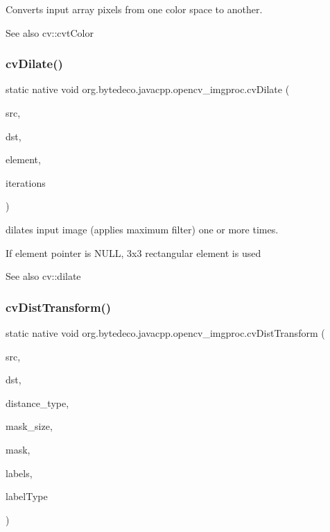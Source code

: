 Converts input array pixels from one color space to another. 

\begin{DoxySeeAlso}{See also}
cv\+::cvt\+Color 
\end{DoxySeeAlso}
\mbox{\label{group__imgproc__c_gae80f82cb5e9876985e59aec2267f7ad4}} 
\subsubsection{\texorpdfstring{cv\+Dilate()}{cvDilate()}}
{\footnotesize\ttfamily static native void org.\+bytedeco.\+javacpp.\+opencv\+\_\+imgproc.\+cv\+Dilate (\begin{DoxyParamCaption}\item[{@Const Cv\+Arr}]{src,  }\item[{Cv\+Arr}]{dst,  }\item[{Ipl\+Conv\+Kernel}]{element,  }\item[{int}]{iterations }\end{DoxyParamCaption})\hspace{0.3cm}{\ttfamily [static]}}



dilates input image (applies maximum filter) one or more times. 

If element pointer is N\+U\+LL, 3x3 rectangular element is used \begin{DoxySeeAlso}{See also}
cv\+::dilate 
\end{DoxySeeAlso}
\mbox{\label{group__imgproc__c_ga1d40b29d515e71fe7026248f482923d6}} 
\subsubsection{\texorpdfstring{cv\+Dist\+Transform()}{cvDistTransform()}}
{\footnotesize\ttfamily static native void org.\+bytedeco.\+javacpp.\+opencv\+\_\+imgproc.\+cv\+Dist\+Transform (\begin{DoxyParamCaption}\item[{@Const Cv\+Arr}]{src,  }\item[{Cv\+Arr}]{dst,  }\item[{int}]{distance\+\_\+type,  }\item[{int}]{mask\+\_\+size,  }\item[{@Const Float\+Pointer}]{mask,  }\item[{Cv\+Arr}]{labels,  }\item[{int}]{label\+Type }\end{DoxyParamCaption})\hspace{0.3cm}{\ttfamily [static]}}




